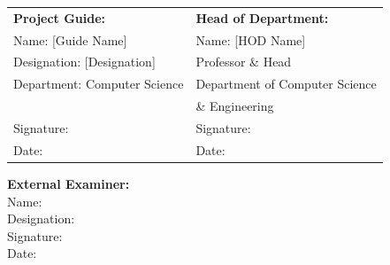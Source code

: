 \vspace{2cm}

\noindent
\begin{tabular}{@{}p{}p{}@{}}
\textbf{Project Guide:} & \textbf{Head of Department:}\\[0.5cm]
Name: [Guide Name] & Name: [HOD Name]\\
Designation: [Designation] & Professor \& Head\\
Department: Computer Science & Department of Computer Science\\
& \& Engineering\\[1.5cm]
Signature: \underline{\hspace{3cm}} & Signature: \underline{\hspace{3cm}}\\[0.5cm]
Date: \underline{\hspace{3cm}} & Date: \underline{\hspace{3cm}}
\end{tabular}

\vspace{2cm}

\noindent
\textbf{External Examiner:}\\[0.5cm]
Name: \underline{\hspace{8cm}}\\[0.5cm]
Designation: \underline{\hspace{8cm}}\\[0.5cm]
Signature: \underline{\hspace{3cm}}\\[0.5cm]
Date: \underline{\hspace{3cm}}

\newpage
